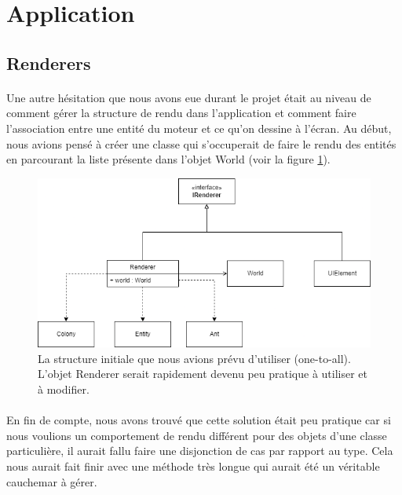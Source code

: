 \documentclass{EPUProjetDi}
\begin{document}
\section{Application}

\subsection{Renderers}
\paragraph{}
Une autre hésitation que nous avons eue durant le projet était au niveau de comment gérer la structure de rendu dans l'application et comment 
faire l'association entre une entité du moteur et ce qu'on dessine à l'écran. Au début, nous avions pensé à créer une classe qui s'occuperait de faire le rendu des
entités en parcourant la liste présente dans l'objet World (voir la figure \ref{fig:renderer_logic_1}). 

\begin{figure}[h]
    \centering
    \includegraphics[scale=0.5]{renderer_logic_1.png}
    \caption{La structure initiale que nous avions prévu d'utiliser (one-to-all). L'objet Renderer serait rapidement devenu peu pratique à utiliser et à modifier.}
    \label{fig:renderer_logic_1}
\end{figure}

\paragraph{}
En fin de compte, nous avons trouvé que cette solution était peu pratique car si nous voulions un comportement 
de rendu différent pour des objets d'une classe particulière, il aurait fallu faire une disjonction de cas par rapport au type. Cela nous aurait fait finir avec
une méthode très longue qui aurait été un véritable cauchemar à gérer. 
\end{document}
